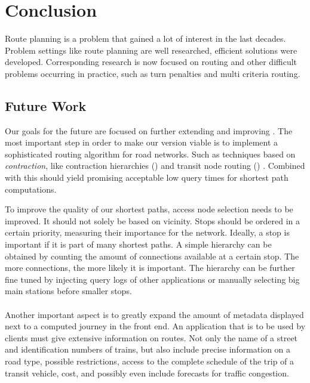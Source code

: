 \chapter{Conclusion}\label{conclusion}
	Route planning is a problem that gained a lot of interest in the last decades. Problem settings like \uniModal route planning are
	well researched, efficient solutions were developed. Corresponding research is now focused on \multiModal routing and other difficult problems
	occurring in practice, such as turn penalties and multi criteria routing.

\section{Future Work}
	Our goals for the future are focused on further extending and improving \cobweb. The most important step in order to make our \anr version
	viable is to implement a sophisticated routing algorithm for road networks. Such as techniques based on \textit{contraction}, like contraction
	hierarchies (\ch)  and transit node routing (\tnr) . Combined with \csa this should yield promising
	acceptable low query times for shortest path computations.
	
	To improve the quality of our shortest paths, access node selection needs to be improved. It should not solely be based on vicinity.
	Stops should be ordered in a certain priority, measuring their importance for the network. Ideally, a stop is important if it is part
	of many shortest paths. A simple hierarchy can be obtained by counting the amount of connections available at a certain stop.
	The more connections, the more likely it is important.
	The hierarchy can be further fine tuned by injecting query logs of other applications or manually selecting big main
	stations before smaller stops.\\\\
	Another important aspect is to greatly expand the amount of metadata displayed next to a computed journey in the front end.
	An application that is to be used by clients must give extensive information on routes. Not only the name of a street and identification numbers of
	trains, but also include precise information on a road type, possible restrictions, access to the complete schedule of the trip of a transit vehicle,
	cost, and possibly even include forecasts for traffic congestion.
	
